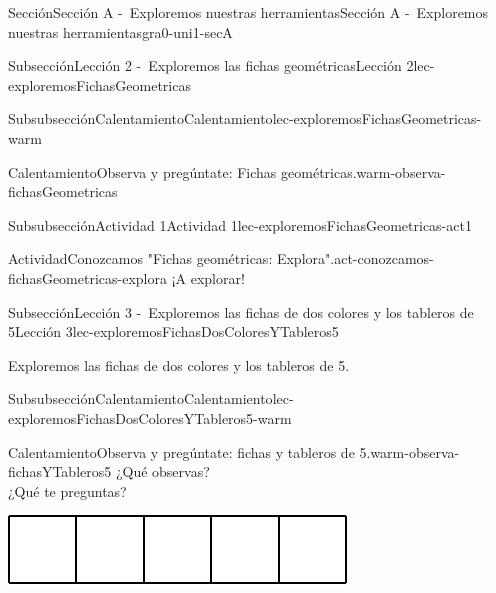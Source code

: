\documentclass[twoside,10pt,]{article}
\begin{document}
\begin{sectionptx}{Sección}{Sección A -~Exploremos nuestras herramientas}{}{Sección A -~Exploremos nuestras herramientas}{}{}{gra0-uni1-secA}
\begin{subsectionptx}{Subsección}{Lección 2 -~Exploremos las fichas geométricas}{}{Lección 2}{}{}{lec-exploremosFichasGeometricas}
\begin{subsubsectionptx}{Subsubsección}{Calentamiento}{}{Calentamiento}{}{}{lec-exploremosFichasGeometricas-warm}
\begin{exploration}{Calentamiento}{Observa y pregúntate: Fichas geométricas.}{warm-observa-fichasGeometricas}
\begin{image}{0}{1}{0}{}
\end{image}%
\end{exploration}%
\end{subsubsectionptx}
%
%
\typeout{************************************************}
\typeout{************************************************}
%
\begin{subsubsectionptx}{Subsubsección}{Actividad 1}{}{Actividad 1}{}{}{lec-exploremosFichasGeometricas-act1}
\begin{activity}{Actividad}{Conozcamos "Fichas geométricas: Explora".}{act-conozcamos-fichasGeometricas-explora}%
¡A explorar!%
\end{activity}%
\end{subsubsectionptx}
\end{subsectionptx}
%
%
\typeout{************************************************}
\typeout{************************************************}
%
\begin{subsectionptx}{Subsección}{Lección 3 -~Exploremos las fichas de dos colores y los tableros de 5}{}{Lección 3}{}{}{lec-exploremosFichasDosColoresYTableros5}
\begin{introduction}{}%
Exploremos las fichas de dos colores y los tableros de 5.%
\end{introduction}%
%
%
\typeout{************************************************}
\typeout{************************************************}
%
\begin{subsubsectionptx}{Subsubsección}{Calentamiento}{}{Calentamiento}{}{}{lec-exploremosFichasDosColoresYTableros5-warm}
\begin{exploration}{Calentamiento}{Observa y pregúntate: fichas y tableros de 5.}{warm-observa-fichasYTableros5}%
¿Qué observas?\\
 ¿Qué te preguntas?%
\begin{sidebyside}{2}{0.05}{0.05}{0.1}%
\begin{sbspanel}{0.4}%
\includegraphics[width=\linewidth]{external/svg-source/tikz-file-147345.pdf}
\end{sbspanel}%
\begin{sbspanel}{0.4}%

\end{sbspanel}
\end{sidebyside}
\end{exploration}
\end{subsubsectionptx}
\end{subsectionptx}
\end{sectionptx}
\end{document}
